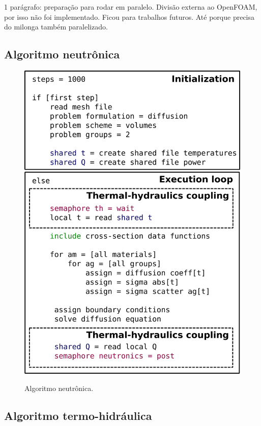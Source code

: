 1 parágrafo: preparação para rodar em paralelo. Divisão externa ao OpenFOAM, por isso não foi
implementado. Ficou para trabalhos futuros. Até porque precisa do milonga também paralelizado.

\subsection{Algoritmo neutrônica}

\begin{figure}[htb]
  \caption{Algoritmo neutrônica.}
  \centering\includegraphics[scale=0.5]{figuras/algoritmos_milonga.png}
  \label{algo_neutronica}
\end{figure}

\subsection{Algoritmo termo-hidráulica}
\label{subsec:th}

